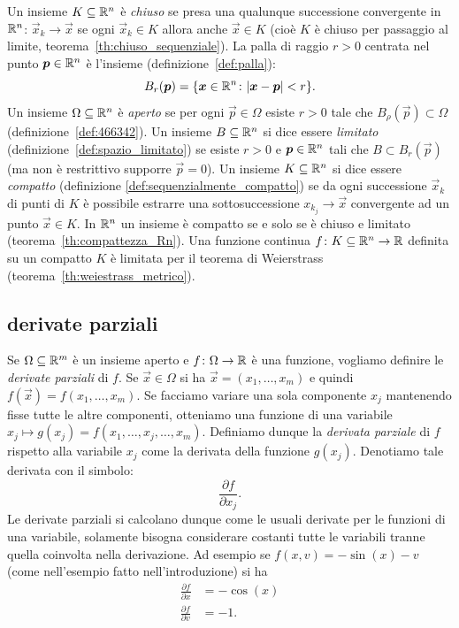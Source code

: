 Un insieme $K\subseteq {\mathbb R}^n$ è \emph{chiuso}%
se presa una qualunque successione convergente in ${\mathbb R}^n$:
$\vec x_k \to \vec x$ se ogni $\vec x_k\in K$ allora anche 
$\vec x \in K$ (cioè $K$ è chiuso per passaggio al limite,
teorema~\ref{th:chiuso_sequenziale}).
La palla di raggio $r>0$ centrata nel punto $\boldsymbol p\in {\mathbb R}^n$ 
è l'insieme (definizione~\ref{def:palla}):
\[
  B_r(\boldsymbol p) = {\left\{ \boldsymbol x \in {\mathbb R}^n\colon {\left|\boldsymbol x - \boldsymbol p\right|}< r \right\}}.  
\]
Un insieme $\Omega\subseteq {\mathbb R}^n$ è \emph{aperto}
se per ogni $\vec p\in \Omega$ esiste $r>0$ tale che $B_\rho(\vec p) \subset \Omega$
(definizione~\ref{def:466342}).
Un insieme $B\subseteq {\mathbb R}^n$ si dice essere \emph{limitato}
(definizione~\ref{def:spazio_limitato})
se esiste $r>0$ e $\boldsymbol p\in{\mathbb R}^n$ tali che $B\subset B_r(\vec p)$ 
(ma non è restrittivo supporre $\vec p=0$).
Un insieme $K\subseteq {\mathbb R}^n$ si dice essere \emph{compatto} 
(definizione \ref{def:sequenzialmente_compatto}) se da ogni successione 
$\vec x_k$ di punti di $K$ è possibile estrarre una sottosuccessione $x_{k_j} \to \vec x$ 
convergente ad un punto $\vec x \in K$.
In ${\mathbb R}^n$ un insieme è compatto se e solo se è chiuso e limitato
(teorema~\ref{th:compattezza_Rn}).
Una funzione continua $f\colon K\subseteq {\mathbb R}^n\to{\mathbb R}$ definita
su un compatto $K$ è limitata per il teorema di Weierstrass (teorema~\ref{th:weiestrass_metrico}).


\subsection{derivate parziali}

Se $\Omega\subseteq {\mathbb R}^m$ è un insieme aperto e $f\colon \Omega \to {\mathbb R}$
è una funzione, vogliamo definire le \emph{derivate parziali} di $f$.
Se $\vec x \in \Omega$ si ha $\vec x = (x_1,\dots, x_m)$ e quindi
$f(\vec x) = f(x_1,\dots, x_m)$. Se facciamo variare una sola componente
$x_j$ mantenendo fisse tutte le altre componenti, otteniamo una funzione
di una variabile $x_j \mapsto g(x_j) = f(x_1,\dots, x_j, \dots, x_m)$.
Definiamo dunque la \emph{derivata parziale}
di $f$ rispetto alla variabile $x_j$ come la derivata della funzione $g(x_j)$.
Denotiamo tale derivata con il simbolo:
\[
  \frac{\partial f}{\partial x_j}.
\]
Le derivate parziali si calcolano dunque come le usuali derivate per le
funzioni di una variabile, solamente bisogna considerare costanti tutte
le variabili tranne quella coinvolta nella derivazione.
Ad esempio se $f(x,v) = -\sin(x) - v$
(come nell'esempio fatto nell'introduzione) si ha
\begin{align*}
  \frac{\partial f}{\partial x} &= -\cos(x)\\
  \frac{\partial f}{\partial v} &= -1.
\end{align*}

